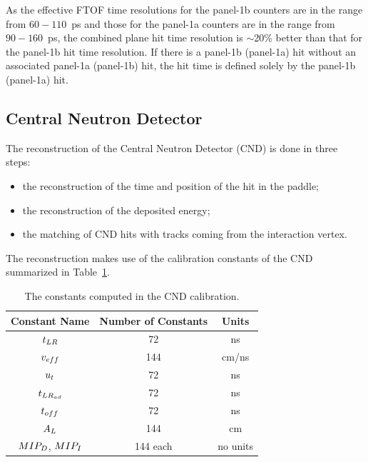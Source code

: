 \documentclass{elsart}
\begin{document}
As the effective FTOF time resolutions for the panel-1b counters are in the range from $60-110$~ps and those
for the panel-1a counters are in the range from $90-160$~ps, the combined plane hit time resolution is $\sim$20\%
better than that for the panel-1b hit time resolution. If there is a panel-1b (panel-1a) hit without an associated
panel-1a (panel-1b) hit, the hit time is defined solely by the panel-1b (panel-1a) hit.

\subsection{Central Neutron Detector}

The reconstruction of the Central Neutron Detector (CND) is done in three steps:

\begin{itemize}
\item{the reconstruction of the time and position of the hit in the paddle;}
\item{the reconstruction of the deposited energy;}
\item{the matching of CND hits with tracks coming from the interaction vertex.}
\end{itemize}

The reconstruction makes use of the calibration constants of the CND summarized in
Table~\ref{table_cnd_constants}.

\begin{table}[htbp]
\begin{center}
\begin{tabular}{|c|c|c|} \hline
Constant Name & Number of Constants  & Units \\ \hline
$t_{\rm{LR}}$ & 72 & ns\\ \hline
$v_{\rm{eff}}$ & 144 & cm/ns \\ \hline
$u_{\rm{t}}$ & 72 & ns \\ \hline
$t_{\rm{LR}_{\rm{ad}}}$ & 72 & ns \\ \hline
$t_{\rm{off}}$ &72 & ns\\ \hline
$A_{\rm{L}}$ & 144 & cm\\ \hline
$MIP_{\rm{D}}$, $MIP_{\rm{I}}$ & 144 each & no units \\ \hline
\end{tabular}
\caption{The constants computed in the CND calibration.}
\label{table_cnd_constants}
\end{center}
\end{table}
\end{document}
